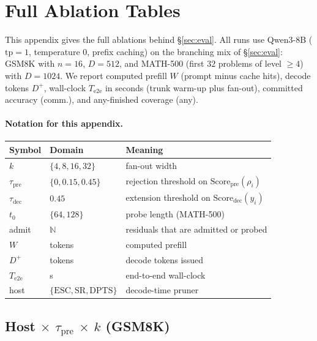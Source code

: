 \section{Full Ablation Tables}
\label{sec:ablation-full}

This appendix gives the full ablations behind \S\ref{sec:eval}.
All runs use Qwen3-8B ($\mathrm{tp}{=}1$, temperature $0$, prefix caching) on the branching mix of \S\ref{sec:eval}:
GSM8K with $n{=}16$, $D{=}512$, and MATH-500 (first $32$ problems of level $\ge4$) with $D{=}1024$.
We report computed prefill $W$ (prompt minus cache hits), decode tokens $D^{+}$, wall-clock $T_{\mathrm{e2e}}$ in seconds (trunk warm-up plus fan-out),
committed accuracy (comm.), and any-finished coverage (any).

\paragraph{Notation for this appendix.}
\begin{center}
\scriptsize
\begin{tabular}{@{}llp{}@{}}
\toprule
Symbol & Domain & Meaning \\
\midrule
$k$ & $\{4,8,16,32\}$ & fan-out width \\
$\tau_{\mathrm{pre}}$ & $\{0,0.15,0.45\}$ & rejection threshold on $\mathrm{Score}_{\mathrm{pre}}(\rho_i)$ \\
$\tau_{\mathrm{dec}}$ & $0.45$ & extension threshold on $\mathrm{Score}_{\mathrm{dec}}(y_i)$ \\
$t_0$ & $\{64,128\}$ & probe length (MATH-500) \\
admit & $\mathbb{N}$ & residuals that are admitted or probed \\
$W$ & tokens & computed prefill \\
$D^{+}$ & tokens & decode tokens issued \\
$T_{\mathrm{e2e}}$ & s & end-to-end wall-clock \\
host & $\{\mathrm{ESC},\mathrm{SR},\mathrm{DPTS}\}$ & decode-time pruner \\
\bottomrule
\end{tabular}
\end{center}

\subsection{Host $\times$ $\tau_{\mathrm{pre}}$ $\times$ $k$ (GSM8K)}
\label{sec:ablate-thresh}

